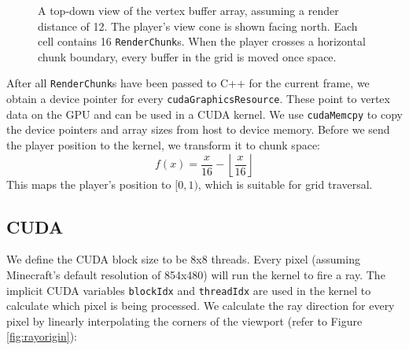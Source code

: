 \documentclass[]{article}
\begin{document}
\begin{figure}
  \centering
  \caption[Top-down view of vertex buffer array]{
    A top-down view of the vertex buffer array, assuming a render distance of 12.
    The player's view cone is shown facing north.
    Each cell contains 16 \texttt{RenderChunk}s.
    When the player crosses a horizontal chunk boundary, every buffer in the grid is moved once space.
  }
  \label{fig:grid}
\end{figure}

After all \texttt{RenderChunk}s have been passed to C++ for the current frame, we obtain a device pointer for every \texttt{cudaGraphicsResource}.
These point to vertex data on the GPU and can be used in a CUDA kernel.
We use \texttt{cudaMemcpy} to copy the device pointers and array sizes from host to device memory.
Before we send the player position to the kernel, we transform it to chunk space:
\begin{equation}
f(x) = \frac{x}{16} - \left\lfloor\frac{x}{16}\right\rfloor
\end{equation}
This maps the player's position to $[0, 1)$, which is suitable for grid traversal.

\subsection{CUDA}
We define the CUDA block size to be 8x8 threads.
Every pixel (assuming Minecraft's default resolution of 854x480) will run the kernel to fire a ray.
The implicit CUDA variables \texttt{blockIdx} and \texttt{threadIdx} are used in the kernel to calculate which pixel is being processed.
We calculate the ray direction for every pixel by linearly interpolating the corners of the viewport (refer to Figure \ref{fig:rayorigin}):
\end{document}
